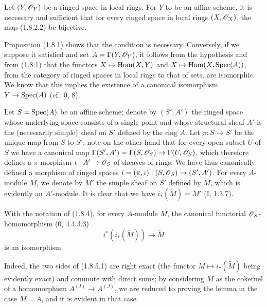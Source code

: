 \begin{corollary}[1.8.3]
\label{ega2:addendum:I.1.8.3}
Let $(Y,\mathscr{O}_Y)$ be a ringed space in local rings. For $Y$
to be an affine scheme, it is necessary and sufficient that for every
ringed space in local rings $(X,\mathscr{O}_X)$, the map (1.8.2.2) be
bijective.
\end{corollary}

Proposition (1.8.1) shows that the condition is necessary.
Conversely, if we suppose it satisfied and set
$A=\Gamma(Y,\mathscr{O}_Y)$, it follows from the hypothesis and from (1.8.1) that
the functors $X\mapsto\operatorname{Hom}(X,Y)$ and
$X\mapsto\operatorname{Hom}(X,\operatorname{Spec}(A))$, from the category of ringed spaces in
local rings to that of sets, are isomorphic. We know that
this implies the existence of a canonical isomorphism
$Y\to\operatorname{Spec}(A)$ (cf.~0, 8).

\begin{env}[1.8.4]
\label{ega2:addendum:I.1.8.4}
Let $S=\operatorname{Spec}(A)$ be an affine scheme; denote by $(S',A')$ the ringed
space whose underlying space consists of a single point and whose
structural sheaf $A'$ is the (necessarily simple) sheaf on $S'$ defined
by the ring $A$. Let $\pi:S\to S'$ be the unique map from $S$ to
$S'$; note on the other hand that for every open subset $U$ of $S$ we have a
canonical map
$\Gamma(S',A')=\Gamma(S,\mathscr{O}_S)\to\Gamma(U,\mathscr{O}_S)$, which therefore
defines a $\pi$-morphism $\iota:A'\to\mathscr{O}_S$ of sheaves of rings.
We have thus canonically defined a morphism of ringed spaces
$i=(\pi,\iota):(S,\mathscr{O}_S)\to(S',A')$. For every $A$-module $M$, we
denote by $M'$ the simple sheaf on $S'$ defined by $M$, which
is evidently an $A'$-module. It is clear that we have
$i_*(\widetilde M)=M'$ (I, 1.3.7).
\end{env}

\begin{lemma}[1.8.5]
\label{ega2:addendum:I.1.8.5}
With the notation of (1.8.4), for every $A$-module $M$, the
canonical functorial $\mathscr{O}_S$-homomorphism (0, 4.4.3.3)
\begin{equation}
\label{ega2:addendum:I.1.8.5.1}
  i^*(i_*(\widetilde M))\to\widetilde M
\tag{1.8.5.1}
\end{equation}
is an isomorphism.
\end{lemma}

Indeed, the two sides of (1.8.5.1) are right exact (the
functor $M\mapsto i_*(\widetilde M)$ being evidently exact) and
commute with direct sums; by considering $M$ as the cokernel of a
homomorphism $A^{(I)}\to A^{(J)}$, we are reduced to proving the lemma
in the case $M=A$, and it is evident in that case.

